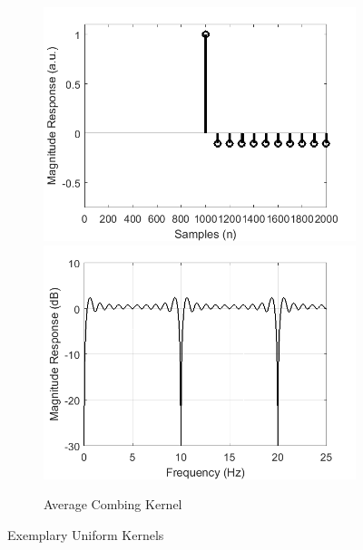 \documentclass[a4paper]{article}
\begin{document}
\begin{figure}[hbtp]
\begin{subfigure}{.5\textwidth}
        \includegraphics[width=\textwidth]{img/kernel_ave.png}\\
        \includegraphics[width=\textwidth]{img/mag_ave.png}
        \caption{Average Combing Kernel}\label{fig:AverageKernel}
    \end{subfigure}
    \caption{Exemplary Uniform Kernels}\label{fig:UniformKernels}
\end{figure}
\end{document}
